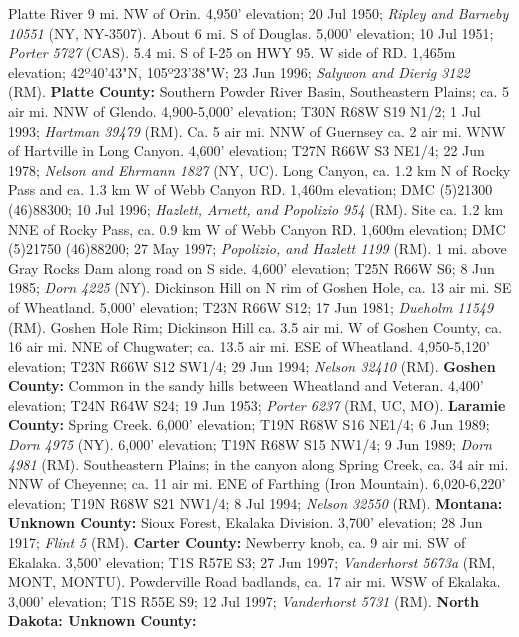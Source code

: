 Platte River 9 mi. NW of Orin. 4,950' elevation; 20 Jul 1950;
\textit{Ripley and Barneby 10551} (NY, NY-3507).
About 6 mi. S of Douglas. 5,000' elevation; 10 Jul 1951;
\textit{Porter 5727} (CAS).
5.4 mi. S of I-25 on HWY 95. W side of RD. 1,465m elevation; 42º40'43"N,
105º23'38"W; 23 Jun 1996; \textit{Salywon and Dierig 3122} (RM).
  \textbf{Platte County:}
Southern Powder River Basin, Southeastern Plains; ca. 5 air mi. NNW of Glendo.
4,900-5,000' elevation; T30N R68W S19 N1/2; 1 Jul 1993;
\textit{Hartman 39479} (RM).
Ca. 5 air mi. NNW of Guernsey ca. 2 air mi. WNW of Hartville in Long Canyon.
4,600' elevation; T27N R66W S3 NE1/4; 22 Jun 1978;
\textit{Nelson and Ehrmann 1827} (NY, UC).
Long Canyon, ca. 1.2 km N of Rocky Pass and ca. 1.3 km W of Webb Canyon RD.
1,460m elevation; DMC (5)21300 (46)88300; 10 Jul 1996;
\textit{Hazlett, Arnett, and Popolizio 954} (RM).
Site ca. 1.2 km NNE of Rocky Pass, ca. 0.9 km W of Webb Canyon RD.
1,600m elevation; DMC (5)21750 (46)88200; 27 May 1997;
\textit{Popolizio, and Hazlett 1199} (RM).
1 mi. above Gray Rocks Dam along road on S side. 4,600' elevation; T25N R66W S6;
8 Jun 1985; \textit{Dorn 4225} (NY).
Dickinson Hill on N rim of Goshen Hole, ca. 13 air mi. SE of Wheatland.
5,000' elevation; T23N R66W S12; 17 Jun 1981; \textit{Dueholm 11549} (RM).
Goshen Hole Rim; Dickinson Hill ca. 3.5 air mi. W of Goshen County, ca. 16 air
mi. NNE of Chugwater; ca. 13.5 air mi. ESE of Wheatland. 4,950-5,120' elevation;
T23N R66W S12 SW1/4; 29 Jun 1994; \textit{Nelson 32410} (RM).
  \textbf{Goshen County:}
Common in the sandy hills between Wheatland and Veteran. 4,400' elevation;
T24N R64W S24; 19 Jun 1953; \textit{Porter 6237} (RM, UC, MO).
  \textbf{Laramie County:}
Spring Creek. 6,000' elevation; T19N R68W S16 NE1/4; 6 Jun 1989;
\textit{Dorn 4975} (NY).
6,000' elevation; T19N R68W S15 NW1/4; 9 Jun 1989; \textit{Dorn 4981} (RM).
Southeastern Plains; in the canyon along Spring Creek, ca. 34 air mi. NNW of
Cheyenne; ca. 11 air mi. ENE of Farthing (Iron Mountain). 6,020-6,220'
elevation; T19N R68W S21 NW1/4; 8 Jul 1994; \textit{Nelson 32550} (RM).
  \textbf{Montana: Unknown County:}
Sioux Forest, Ekalaka Division. 3,700' elevation; 28 Jun 1917;
\textit{Flint 5} (RM).
  \textbf{Carter County:}
Newberry knob, ca. 9 air mi. SW of Ekalaka. 3,500' elevation; T1S R57E S3;
27 Jun 1997; \textit{Vanderhorst 5673a} (RM, MONT, MONTU).
Powderville Road badlands, ca. 17 air mi. WSW of Ekalaka. 3,000' elevation;
T1S R55E S9; 12 Jul 1997; \textit{Vanderhorst 5731} (RM).
  \textbf{North Dakota: Unknown County:}
